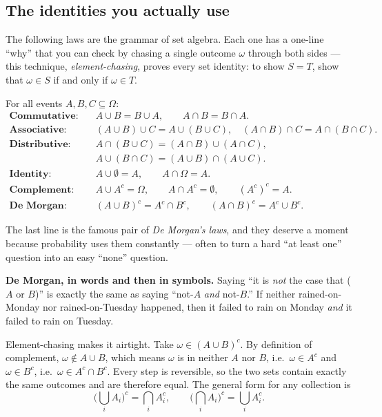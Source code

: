 \subsection{The identities you actually use}

The following laws are the grammar of set algebra. Each one has a one-line
``why'' that you can check by chasing a single outcome $\omega$ through both
sides --- this technique, \emph{element-chasing}, proves every set identity:
to show $S = T$, show that $\omega \in S$ if and only if $\omega \in T$.

\begin{formalbox}
For all events $A, B, C \subseteq \Omega$:
\begin{align*}
\textbf{Commutative:}\quad & A \cup B = B \cup A, \qquad A \cap B = B \cap A.\\
\textbf{Associative:}\quad & (A \cup B)\cup C = A \cup (B \cup C), \quad
  (A \cap B)\cap C = A \cap (B \cap C).\\
\textbf{Distributive:}\quad & A \cap (B \cup C) = (A\cap B)\cup(A\cap C),\\
  & A \cup (B \cap C) = (A\cup B)\cap(A\cup C).\\
\textbf{Identity:}\quad & A \cup \emptyset = A, \qquad A \cap \Omega = A.\\
\textbf{Complement:}\quad & A \cup A^c = \Omega, \qquad A \cap A^c = \emptyset,
  \qquad (A^c)^c = A.\\
\textbf{De Morgan:}\quad & (A \cup B)^c = A^c \cap B^c, \qquad
  (A \cap B)^c = A^c \cup B^c.
\end{align*}
\end{formalbox}

The last line is the famous pair of \emph{De Morgan's laws}, and they deserve
a moment because probability uses them constantly --- often to turn a hard
``at least one'' question into an easy ``none'' question.

\begin{whybox}
\textbf{De Morgan, in words and then in symbols.} Saying ``it is \emph{not}
the case that ($A$ or $B$)'' is exactly the same as saying ``not-$A$ \emph{and}
not-$B$.'' If neither rained-on-Monday nor rained-on-Tuesday happened, then it
failed to rain on Monday \emph{and} it failed to rain on Tuesday.

Element-chasing makes it airtight. Take $\omega \in (A\cup B)^c$. By
definition of complement, $\omega \notin A \cup B$, which means $\omega$ is in
neither $A$ nor $B$, i.e.\ $\omega \in A^c$ and $\omega \in B^c$, i.e.\
$\omega \in A^c \cap B^c$. Every step is reversible, so the two sets contain
exactly the same outcomes and are therefore equal. The general form for any
collection is
\[
  \Big(\bigcup_i A_i\Big)^c = \bigcap_i A_i^c, \qquad
  \Big(\bigcap_i A_i\Big)^c = \bigcup_i A_i^c.
\]
\end{whybox}

